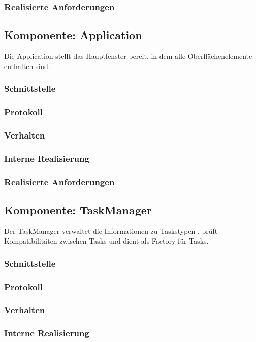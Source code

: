 \documentclass[a4paper,12pt]{scrartcl}
\begin{document}
\subsubsection{Realisierte Anforderungen}

\subsection{Komponente: Application}
Die Application stellt das Hauptfenster bereit, in dem alle Oberflächenelemente enthalten sind.
\subsubsection{Schnittstelle}
\subsubsection{Protokoll}
\subsubsection{Verhalten}
\subsubsection{Interne Realisierung}
\subsubsection{Realisierte Anforderungen}

\subsection{Komponente: TaskManager}
Der TaskManager verwaltet die Informationen zu Taskstypen , prüft Kompatibilitäten zwischen Tasks und dient als Factory für Tasks.
\subsubsection{Schnittstelle}
\subsubsection{Protokoll}
\subsubsection{Verhalten}
\subsubsection{Interne Realisierung}
\end{document}
